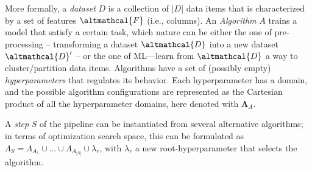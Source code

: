 More formally, a \textit{dataset} $D$ is a collection of $|D|$ data items that is characterized by a set of features $\altmathcal{F}$ (i.e., columns).
%
An \textit{Algorithm} $A$ trains a model that satisfy a certain task, which nature can be either the one of pre-processing -- transforming a dataset $\altmathcal{D}$ into a new dataset $\altmathcal{D}'$ -- or the one of ML---learn from $\altmathcal{D}$ a way to cluster/partition data items.
Algorithms have a set of (possibly empty) \textit{hyperparameters} that regulates its behavior.
%
Each hyperparameter has a domain, and the possible algorithm configurations are represented as the Cartesian product of all the hyperparameter domains, here denoted with $\pmb{\Lambda}_A$.
%
%
%

A \textit{step} $S$ of the pipeline can be instantiated from several alternative algorithms; in terms of optimization search space, this can be formulated as
%
$\Lambda_S = \Lambda_{A_1} \cup \ldots \cup \Lambda_{A_{|S|}} \cup \lambda_r$, with $\lambda_r$ a new root-hyperparameter that selects the algorithm.
%

